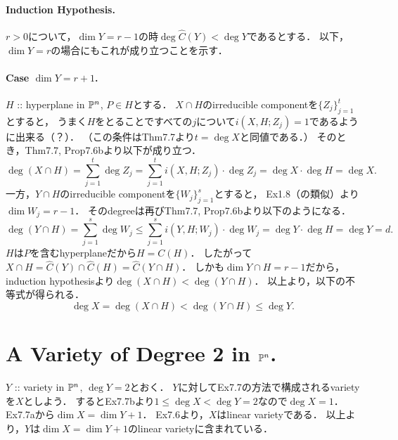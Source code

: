\documentclass[a4paper]{jsarticle}
\begin{document}
    \paragraph{Induction Hypothesis.}
    $r>0$について，$\dim Y=r-1$の時$\deg \hat{C}(Y)<\deg Y$であるとする．
    以下，$\dim Y=r$の場合にもこれが成り立つことを示す．

    \paragraph{Case $\dim Y=r+1$.}
    $H$ :: hyperplane in $\mathbb{P}^n$, $P \in H$とする．
    $X \cap H$のirreducible componentを$\{Z_j\}_{j=1}^t$とすると，
    うまく$H$をとることですべての$j$について$i(X,H; Z_j)=1$であるように出来る（？）．
    （この条件はThm7.7より$t=\deg X$と同値である．）
    そのとき，Thm7.7, Prop7.6bより以下が成り立つ．
    \[ \deg (X \cap H)=\sum_{j=1}^{t} \deg Z_j=\sum_{j=1}^{t} i(X, H; Z_j) \cdot \deg Z_j=\deg X \cdot \deg H=\deg X. \]
    一方，$Y \cap H$のirreducible componentを$\{W_j\}_{j=1}^s$とすると，
    Ex1.8（の類似）より$\dim W_j=r-1$．
    そのdegreeは再びThm7.7, Prop7.6bより以下のようになる．
    \[ \deg (Y \cap H)=\sum_{j=1}^{s} \deg W_j \leq \sum_{j=1}^{s} i(Y, H; W_j) \cdot \deg W_j=\deg Y \cdot \deg H=\deg Y=d. \]
    $H$は$P$を含むhyperplaneだから$H=C(H)$．
    したがって$X \cap H=\hat{C}(Y) \cap \hat{C}(H)=\hat{C}(Y \cap H)$．
    しかも$\dim Y \cap H=r-1$だから，
    induction hypothesisより$\deg (X \cap H)<\deg (Y \cap H)$．
    以上より，以下の不等式が得られる．
    \[ \deg X=\deg (X \cap H)<\deg (Y \cap H) \leq \deg Y. \]

\section{A Variety of Degree 2 in $\mathbb{P}^n$.} %
    $Y$ :: variety in $\mathbb{P}^n$, $\deg Y=2$とおく．
    $Y$に対してEx7.7の方法で構成されるvarietyを$X$としよう．
    するとEx7.7bより$1 \leq \deg X<\deg Y=2$なので$\deg X=1$．
    Ex7.7aから$\dim X=\dim Y+1$．
    Ex7.6より，$X$はlinear varietyである．
    以上より，$Y$は$\dim X=\dim Y+1$のlinear varietyに含まれている．
\end{document}
